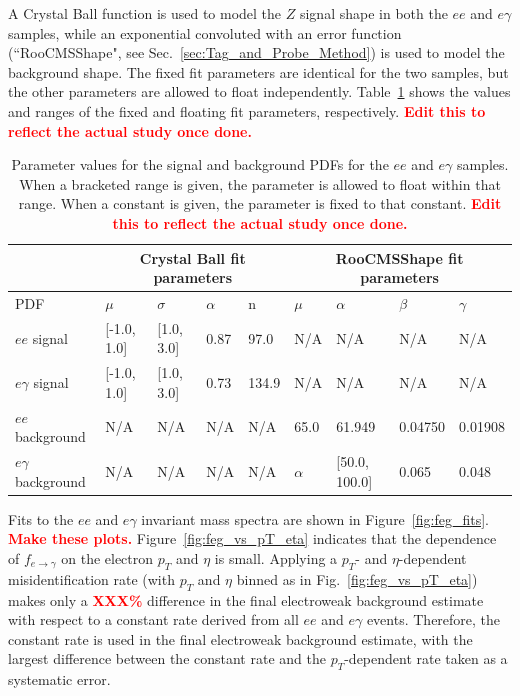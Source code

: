 \documentclass[dissertation.tex]{subfiles}
\begin{document}
A Crystal Ball function is used to model the $Z$ signal shape in both the $ee$ and $e\gamma$ samples, while an exponential convoluted with an error function (``RooCMSShape", see Sec.~\ref{sec:Tag_and_Probe_Method}) is used to model the background shape.  The fixed fit parameters are identical for the two samples, but the other parameters are allowed to float independently.  Table~\ref{tab:feg_fit_parameters} shows the values and ranges of the fixed and floating fit parameters, respectively.  \textcolor{red}{\textbf{Edit this to reflect the actual study once done.}}

\begin{table}[hcbp]
\caption{Parameter values for the signal and background PDFs for the $ee$ and $e\gamma$ samples.  When a bracketed range is given, the parameter is allowed to float within that range.  When a constant is given, the parameter is fixed to that constant.  \textcolor{red}{\textbf{Edit this to reflect the actual study once done.}}}
\centering
\begin{tabular}{|m{1.25cm}|m{1.25cm}|m{1.25cm}|m{1.25cm}|m{1.25cm}|m{1.25cm}|m{1.25cm}|m{1.25cm}|m{1.25cm}|}
\hline
& \multicolumn{4}{c|}{Crystal Ball fit parameters} & \multicolumn{4}{c|}{RooCMSShape fit parameters} \\
\hline
PDF & $\mu$ & $\sigma$ & $\alpha$ & n & $\mu$ & $\alpha$ & $\beta$ & $\gamma$ \\
\hline
$ee$ signal & [-1.0, 1.0] & [1.0, 3.0] & 0.87 & 97.0 & N/A & N/A & N/A & N/A \\
\hline
$e\gamma$ signal & [-1.0, 1.0] & [1.0, 3.0] & 0.73 & 134.9 & N/A & N/A & N/A & N/A \\
\hline
$ee$ background & N/A & N/A & N/A & N/A & 65.0 & 61.949 & 0.04750 & 0.01908 \\
\hline
$e\gamma$ background & N/A & N/A & N/A & N/A & $\alpha$ & [50.0, 100.0] & 0.065 & 0.048 \\
\hline
\end{tabular}
\label{tab:feg_fit_parameters}
\end{table}

Fits to the $ee$ and $e\gamma$ invariant mass spectra are shown in Figure~\ref{fig:feg_fits}.  \textcolor{red}{\textbf{Make these plots.}}  Figure~\ref{fig:feg_vs_pT_eta} indicates that the dependence of $f_{e\rightarrow\gamma}$ on the electron $p_{T}$ and $\eta$ is small.  Applying a $p_{T}$- and $\eta$-dependent misidentification rate (with $p_{T}$ and $\eta$ binned as in Fig.~\ref{fig:feg_vs_pT_eta}) makes only a \textcolor{red}{\textbf{XXX\%}} difference in the final electroweak background estimate with respect to a constant rate derived from all $ee$ and $e\gamma$ events.  Therefore, the constant rate is used in the final electroweak background estimate, with the largest difference between the constant rate and the $p_{T}$-dependent rate taken as a systematic error.
\end{document}
